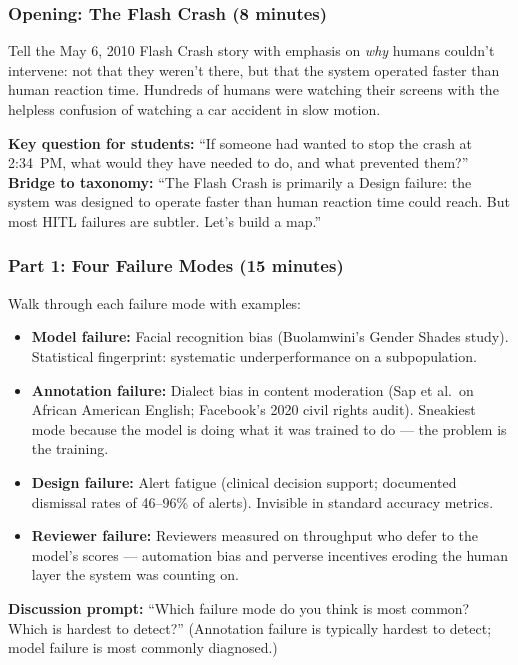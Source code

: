 \subsubsection{Opening: The Flash Crash (8 minutes)}

Tell the May 6, 2010 Flash Crash story with emphasis on \emph{why} humans couldn't intervene: not that they weren't there, but that the system operated faster than human reaction time. Hundreds of humans were watching their screens with the helpless confusion of watching a car accident in slow motion.

\begin{trythis}
\textbf{Key question for students:} ``If someone had wanted to stop the crash at 2:34~PM, what would they have needed to do, and what prevented them?''\\[0.5em]
\textbf{Bridge to taxonomy:} ``The Flash Crash is primarily a Design failure: the system was designed to operate faster than human reaction time could reach. But most HITL failures are subtler. Let's build a map.''
\end{trythis}

\subsubsection{Part 1: Four Failure Modes (15 minutes)}

Walk through each failure mode with examples:
\begin{itemize}
    \item \textbf{Model failure:} Facial recognition bias (Buolamwini's Gender Shades study). Statistical fingerprint: systematic underperformance on a subpopulation.
    \item \textbf{Annotation failure:} Dialect bias in content moderation (Sap et al.\ on African American English; Facebook's 2020 civil rights audit). Sneakiest mode because the model is doing what it was trained to do --- the problem is the training.
    \item \textbf{Design failure:} Alert fatigue (clinical decision support; documented dismissal rates of 46--96\% of alerts). Invisible in standard accuracy metrics.
    \item \textbf{Reviewer failure:} Reviewers measured on throughput who defer to the model's scores --- automation bias and perverse incentives eroding the human layer the system was counting on.
\end{itemize}

\textbf{Discussion prompt:} ``Which failure mode do you think is most common? Which is hardest to detect?'' (Annotation failure is typically hardest to detect; model failure is most commonly diagnosed.)

